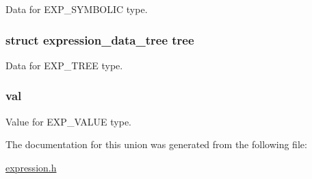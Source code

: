 Data for E\+X\+P\+\_\+\+S\+Y\+M\+B\+O\+L\+I\+C type. 

\hypertarget{unionexpression__data_a786f772ef255a1ea6fbb97622b000bc1}{
\subsubsection[{tree}]{\setlength{\rightskip}{0pt plus 5cm}struct {\bf expression\+\_\+data\+\_\+tree} tree}}\label{unionexpression__data_a786f772ef255a1ea6fbb97622b000bc1}


Data for E\+X\+P\+\_\+\+T\+R\+E\+E type. 

\hypertarget{unionexpression__data_a9999269c3069b319f17690c708789d42}{
\subsubsection[{val}]{ val}}\label{unionexpression__data_a9999269c3069b319f17690c708789d42}


Value for E\+X\+P\+\_\+\+V\+A\+L\+U\+E type. 



The documentation for this union was generated from the following file\+:\begin{DoxyCompactItemize}
\item 
\hyperlink{expression_8h}{expression.\+h}\end{DoxyCompactItemize}
